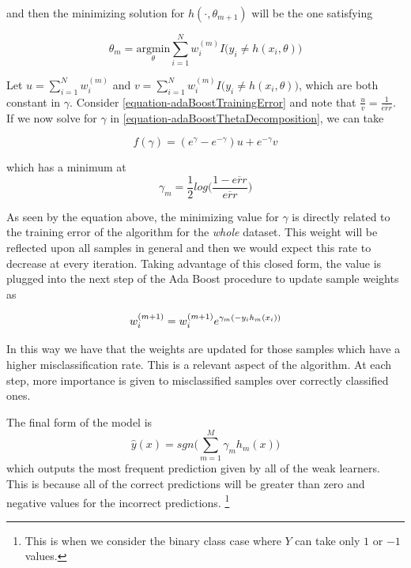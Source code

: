 and then the minimizing solution for $h(\cdot, \theta_{m+1})$ will be the one satisfying

\begin{equation} \label{equation-adaBoostThetaMinimization}
\theta_{m} = \underset{ \theta}{\mathrm{argmin}}  \sum_{i=1}^{N}  w_i^{(m)} I \big( y_i \neq h(x_i,\theta)   \big)
\end{equation}

Let $u = \sum_{i=1}^{N}  w_i^{(m)}$ and $v = \sum_{i=1}^{N}  w_i^{(m)} I \big( y_i \neq h(x_i,\theta)   \big) $, which are both constant in $\gamma$. Consider \ref{equation-adaBoostTrainingError} and note that $\frac{u}{v} = \frac{1}{\overline{err}}$. If we now solve for $\gamma$ in \ref{equation-adaBoostThetaDecomposition}, we can take

\begin{equation} \label{equation-adaBoostBetaMinimization}
f(\gamma) = ( e^{\gamma} - e^{-\gamma}) u +  e^{-\gamma}v
\end{equation}

which has a minimum at
\begin{equation}
\gamma_{m} = \frac{1}{2} log\big( \frac{1 - \overline{err} }{ \overline{err} }  \big)
\end{equation}

As seen by the equation above, the minimizing value for $\gamma$ is directly related to the training error of the algorithm for the \textit{whole} dataset. This weight will be reflected upon all samples in general and then we would expect this rate to decrease at every iteration.  Taking advantage of this closed form, the value is plugged into the next step of the Ada Boost procedure to update sample weights as

\begin{equation}
w_i^{(m+1)} =   w_i^{(m+1)} e^{\gamma_m(-y_i h_m(x_i))} \\
\end{equation}

In this way we have that the weights are updated for those samples which have a higher misclassification rate. This is a relevant aspect of the algorithm. At each step, more importance is given to misclassified samples over correctly classified ones.



The final form of the model is
\begin{equation}
  \hat{y}(x) = sgn\big(  \sum_{m=1}^{M} \gamma_m h_m(x) \big)
\end{equation}
   which outputs the most frequent prediction given by all of the weak learners. This is because all of the correct predictions will be greater than zero and negative values for the incorrect predictions. \footnote{This is when we consider the binary class case where $Y$ can take only $1$ or $-1$ values.}

